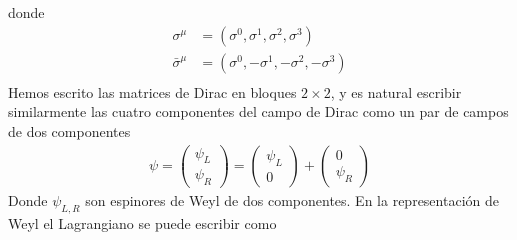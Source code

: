 donde
\begin{align}
  \sigma^\mu&=(\sigma^0,\sigma^1,\sigma^2,\sigma^3)\nonumber\\
  \bar{\sigma}^\mu&=(\sigma^0,-\sigma^1,-\sigma^2,-\sigma^3)\nonumber\\
\end{align}
Hemos escrito las matrices de Dirac en bloques $2\times2$, y es natural escribir similarmente las cuatro componentes del campo de Dirac como un par de campos de dos componentes
\begin{align}
  \psi=  \begin{pmatrix}
    \psi_L\\
    \psi_R    
  \end{pmatrix}=\begin{pmatrix}
    \psi_L\\
    0   
  \end{pmatrix}+\begin{pmatrix}
    0\\
    \psi_R    
  \end{pmatrix}
\end{align}
Donde $\psi_{L,R}$ son espinores de Weyl de dos componentes. En la representaci\'on de Weyl el Lagrangiano se puede escribir como
